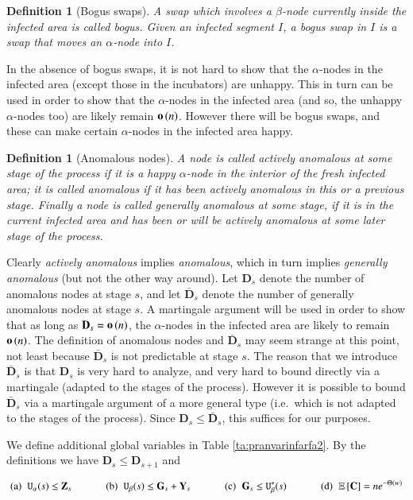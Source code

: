 \documentclass[11pt]{article}
\theoremstyle{plain}
\newtheorem{defi}[thm]{Definition}
\numberwithin{equation}{subsection}
\newcommand{\smo}[1]{\mathop{\bf o}\/\left({#1}\right)}
\newcommand{\DD}{\mathbf{D}}
\newcommand{\GG}{\mathbf{G}}
\newcommand{\YY}{\mathbf{Y}}
\newcommand{\CC}{\mathbf{C}}
\newcommand{\unhap}{\mathtt{U}}
\DeclareRobustCommand{\expe}[2][{\mbox{$\mathbb{E}$}}]{\ensuremath {#1}\left[ {#2} \right]}
\begin{document}
\begin{defi}[Bogus swaps]
A swap
which involves a $\beta$-node 
currently inside the infected area is called bogus. 
Given an infected segment $I$, a bogus swap in $I$ is a
swap that moves an $\alpha$-node into $I$.
\end{defi}

In the absence of bogus swaps, it is not hard to show that the $\alpha$-nodes 
in the infected area (except those in the incubators) are unhappy. This in turn can be used in order to show that 
the $\alpha$-nodes 
in the infected area (and so, the unhappy $\alpha$-nodes too)
are likely remain $\smo{n}$.
However there will be bogus swaps, and these can make certain $\alpha$-nodes in the infected area happy.

\begin{defi}[Anomalous nodes]
A node is called actively anomalous at some stage of the process if it is 
a happy $\alpha$-node in the interior of
the fresh infected area; it is called  anomalous if it has been actively anomalous in this or a previous stage.
Finally a node is called generally anomalous at some stage, if it is in the current infected area and has been
or will be actively anomalous at some later stage of the process.
\end{defi}

Clearly {\em actively anomalous} implies {\em anomalous}, which in turn implies {\em generally anomalous} 
(but not the other way around).
Let $\DD_s$ denote the number of anomalous nodes at stage $s$, and let $\bar{\DD}_s$ denote the number of
generally anomalous nodes at stage $s$.
A martingale argument will be used in order to show that as long as $\DD_s=\smo{n}$, the
$\alpha$-nodes in the infected area are likely to remain $\smo{n}$.
The definition of anomalous nodes and $\bar{\DD}_s$ may seem strange at this point, not least because $\bar{\DD}_s$ 
is not predictable at stage $s$. The reason that we introduce $\bar{\DD}_s$ is that $\DD_s$ is very hard to analyze,
and very hard to bound directly via a martingale (adapted to the stages of the process).  However 
it is possible to bound $\bar{\DD}_s$  via a martingale argument of a more general type (i.e.\ which is
not adapted to the stages of the process). Since $\DD_s\leq \bar{\DD}_s$, this suffices for our purposes. 


We define additional global variables in Table \ref{ta:pranvarinfarfa2}.
By the definitions we have  $\DD_s\leq \DD_{s+1}$ and

\[
\textrm{
(a)\hspace{0.2cm}$\unhap_{\alpha}(s)\leq \mathbf{Z}_s$
\hspace{1cm}
(b)\hspace{0.2cm}$\unhap_{\beta}(s)\leq \GG_s+\YY_s$
\hspace{1cm}
(c)\hspace{0.2cm}$\GG_s\leq \unhap_{\beta}^{\ast}(s)$
\hspace{1cm}
(d)\hspace{0.2cm}$\expe{\CC} = n e^{-\Theta(w)}$
}
\]
\end{document}
